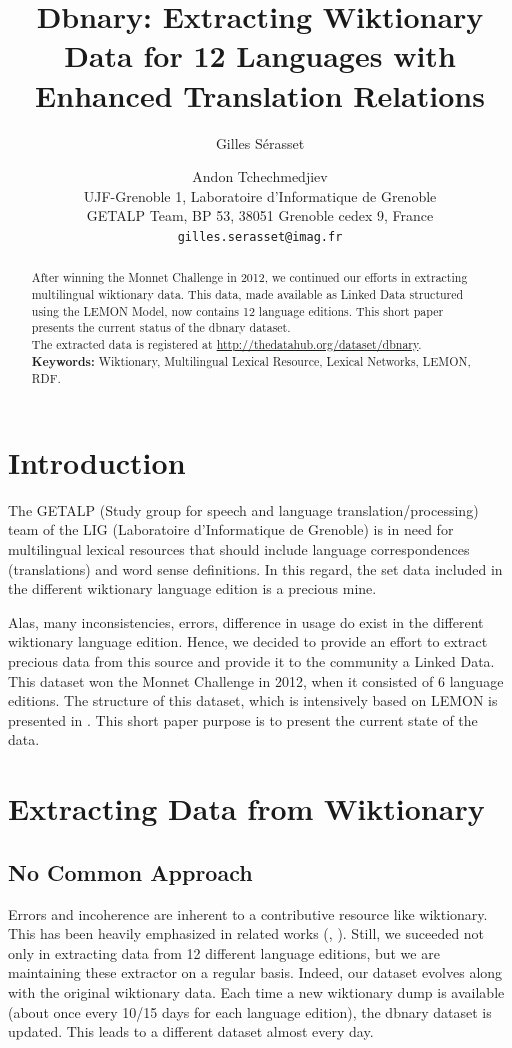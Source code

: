 \documentclass[10pt, a4paper]{article}
\title{Dbnary: Extracting Wiktionary Data for 12 Languages with Enhanced Translation Relations}
\author{Gilles Sérasset \and Andon Tchechmedjiev\\
UJF-Grenoble 1, Laboratoire d'Informatique de Grenoble\\ 
GETALP Team, BP 53, 38051 Grenoble cedex 9, France \\ 
\texttt{gilles.serasset@imag.fr}
\\}
\date{}
\begin{document}
\maketitle

\begin{abstract}
After winning the Monnet Challenge in 2012, we continued our efforts in extracting multilingual wiktionary data. This data, made available as Linked Data structured using the LEMON Model, now contains 12 language editions. This short paper presents the current status of the dbnary dataset.\\
The extracted data is registered at \url{http://thedatahub.org/dataset/dbnary}.
\textbf{Keywords:} Wiktionary, Multilingual Lexical Resource, Lexical Networks, LEMON, RDF.
\end{abstract}


\section{Introduction}

The GETALP (Study group for speech and language translation/processing) team of the LIG (Laboratoire d'Informatique de Grenoble) is in need for multilingual lexical resources that should include language correspondences (translations) and word sense definitions. In this regard, the set data included in the different wiktionary language edition is a precious mine.

Alas, many inconsistencies, errors, difference in usage do exist in the different wiktionary language edition. Hence, we decided to provide an effort to extract precious data from this source and provide it to the community a Linked Data. This dataset won the Monnet Challenge in 2012, when it consisted of 6 language editions. The structure of this dataset, which is intensively based on LEMON is presented in \cite{serasset:dbnary-swj}. This short paper purpose is to present the current state of the data.

\section{Extracting Data from Wiktionary}

\subsection{No Common Approach}

Errors and incoherence are inherent to a contributive resource like wiktionary. This has been heavily emphasized in related works (\cite{HellmannSebastianandBrekleJonasandAuer}, \cite{TUD-CS-2012-0008}). Still, we suceeded not only in extracting data from 12 different language editions, but we are maintaining these extractor on a regular basis. Indeed, our dataset evolves along with the original wiktionary data. Each time a new wiktionary dump is available (about once every 10/15 days for each language edition), the dbnary dataset is updated. This leads to a different dataset almost every day.
\end{document}
